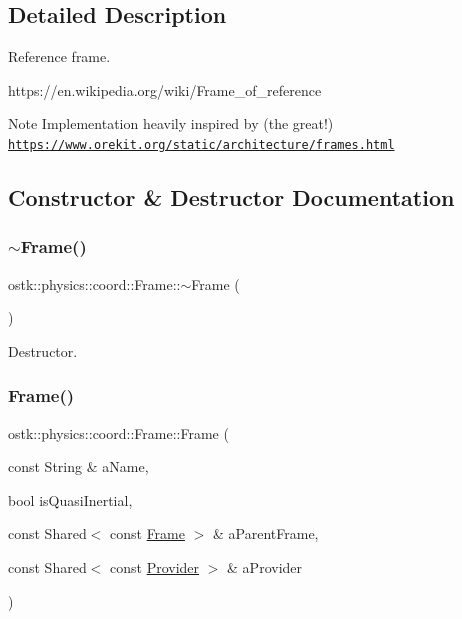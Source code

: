 \subsection{Detailed Description}
Reference frame. 

https\+://en.wikipedia.\+org/wiki/\+Frame\+\_\+of\+\_\+reference \begin{DoxyNote}{Note}
Implementation heavily inspired by (the great!) \href{https://www.orekit.org/static/architecture/frames.html}{\tt https\+://www.\+orekit.\+org/static/architecture/frames.\+html} 
\end{DoxyNote}


\subsection{Constructor \& Destructor Documentation}
\mbox{\label{classostk_1_1physics_1_1coord_1_1_frame_a9c8b5b7869ee8e730e0b23be60920a9d}} 
\subsubsection{\texorpdfstring{$\sim$\+Frame()}{~Frame()}}
{\footnotesize\ttfamily ostk\+::physics\+::coord\+::\+Frame\+::$\sim$\+Frame (\begin{DoxyParamCaption}{ }\end{DoxyParamCaption})}



Destructor. 

\mbox{\label{classostk_1_1physics_1_1coord_1_1_frame_a66f32d0c9dd2497b6e7ace4fcccbce60}} 
\subsubsection{\texorpdfstring{Frame()}{Frame()}\hspace{0.1cm}{\footnotesize\ttfamily [1/2]}}
{\footnotesize\ttfamily ostk\+::physics\+::coord\+::\+Frame\+::\+Frame (\begin{DoxyParamCaption}\item[{const String \&}]{a\+Name,  }\item[{bool}]{is\+Quasi\+Inertial,  }\item[{const Shared$<$ const \hyperlink{classostk_1_1physics_1_1coord_1_1_frame}{Frame} $>$ \&}]{a\+Parent\+Frame,  }\item[{const Shared$<$ const \hyperlink{classostk_1_1physics_1_1coord_1_1frame_1_1_provider}{Provider} $>$ \&}]{a\+Provider }\end{DoxyParamCaption})\hspace{0.3cm}{\ttfamily [protected]}}

